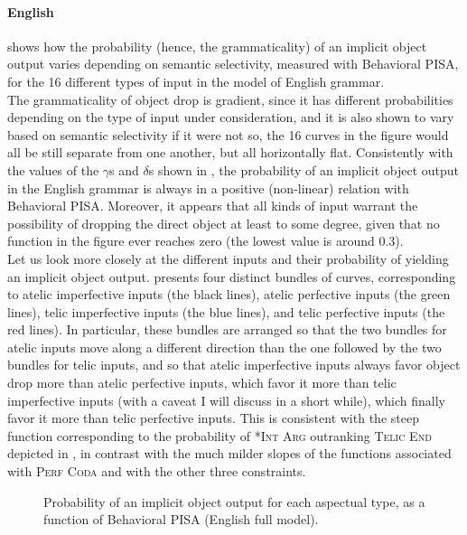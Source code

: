 \paragraph{English} 
 shows how the probability (hence, the grammaticality) of an implicit object output varies depending on semantic selectivity, measured with Behavioral PISA, for the 16 different types of input in the model of English grammar.\\
The grammaticality of object drop is gradient, since it has different probabilities depending on the type of input under consideration, and it is also shown to vary based on semantic selectivity \textemdash if it were not so, the 16 curves in the figure would all be still separate from one another, but all horizontally flat. Consistently with the values of the $\gamma$s and $\delta$s shown in , the probability of an implicit object output in the English grammar is always in a positive (non-linear) relation with Behavioral PISA. Moreover, it appears that all kinds of input warrant the possibility of dropping the direct object at least to some degree, given that no function in the figure ever reaches zero (the lowest value is around 0.3).\\
Let us look more closely at the different inputs and their probability of yielding an implicit object output.  presents four distinct bundles of curves, corresponding to atelic imperfective inputs (the black lines), atelic perfective inputs (the green lines), telic imperfective inputs (the blue lines), and telic perfective inputs (the red lines). In particular, these bundles are arranged so that the two bundles for atelic inputs move along a different direction than the one followed by the two bundles for telic inputs, and so that atelic imperfective inputs always favor object drop more than atelic perfective inputs, which favor it more than telic imperfective inputs (with a caveat I will discuss in a short while), which finally favor it more than telic perfective inputs. This is consistent with the steep function corresponding to the probability of \textsc{*Int Arg} outranking \textsc{Telic End} depicted in , in contrast with the much milder slopes of the functions associated with \textsc{Perf Coda} and with the other three constraints.

\begin{figure}[htb]
\caption{Probability of an implicit object output for each aspectual type, as a function of Behavioral PISA (English full model).}
    
\end{figure}

